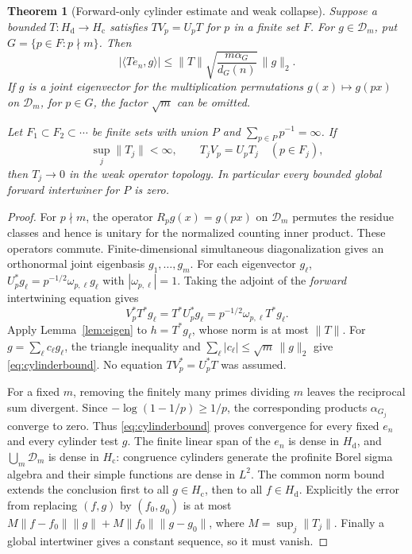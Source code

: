 \documentclass[11pt]{article}
\newtheorem{theorem}{Theorem}
\theoremstyle{remark}
\newcommand{\Hd}{H_{\mathrm d}}
\newcommand{\Hc}{H_{\mathrm c}}
\newcommand{\D}{\mathcal D}
\begin{document}
\begin{theorem}[Forward-only cylinder estimate and weak collapse]\label{thm:forward}
Suppose a bounded $T:\Hd\to\Hc$ satisfies $TV_p=U_pT$ for $p$ in a finite
set $F$.  For $g\in\D_m$, put $G=\{p\in F:p\nmid m\}$.  Then
\begin{equation}\label{eq:cylinderbound}
 |\langle Te_n,g\rangle|
 \leq \|T\|\sqrt{\frac{m\alpha_G}{d_G(n)}}\,\|g\|_2.
\end{equation}
If $g$ is a joint eigenvector for the multiplication permutations
$g(x)\mapsto g(px)$ on $\D_m$, for $p\in G$, the factor $\sqrt m$
can be omitted.

Let $F_1\subset F_2\subset\cdots$ be finite sets with union $P$ and
$\sum_{p\in P}p^{-1}=\infty$.  If
\[
 \sup_j\|T_j\|<\infty,\qquad T_jV_p=U_pT_j\quad(p\in F_j),
\]
then $T_j\longrightarrow0$ in the weak operator topology.
In particular every bounded global forward intertwiner for $P$ is zero.
\end{theorem}
\begin{proof}
For $p\nmid m$, the operator $R_pg(x)=g(px)$ on $\D_m$ permutes the
residue classes and hence is unitary for the normalized counting inner
product.  These operators commute.  Finite-dimensional simultaneous
diagonalization gives an orthonormal joint eigenbasis $g_1,\ldots,g_m$.
For each eigenvector $g_\ell$,
$U_p^*g_\ell=p^{-1/2}\omega_{p,\ell}g_\ell$ with
$|\omega_{p,\ell}|=1$.  Taking the adjoint of the \emph{forward}
intertwining equation gives
\[
 V_p^*T^*g_\ell=T^*U_p^*g_\ell
   =p^{-1/2}\omega_{p,\ell}T^*g_\ell.
\]
Apply Lemma~\ref{lem:eigen} to $h=T^*g_\ell$, whose norm is at most $\|T\|$.
For $g=\sum_\ell c_\ell g_\ell$, the triangle inequality and
$\sum_\ell|c_\ell|\leq\sqrt m\,\|g\|_2$ give
\eqref{eq:cylinderbound}.  No equation $TV_p^*=U_p^*T$ was assumed.

For a fixed $m$, removing the finitely many primes dividing $m$ leaves
the reciprocal sum divergent.  Since
$-\log(1-1/p)\geq1/p$, the corresponding products $\alpha_{G_j}$
converge to zero.  Thus \eqref{eq:cylinderbound} proves convergence for
every fixed $e_n$ and every cylinder test $g$.
The finite linear span of the $e_n$ is dense in $\Hd$, and
$\bigcup_m\D_m$ is dense in $\Hc$: congruence cylinders generate the
profinite Borel sigma algebra and their simple functions are dense in
$L^2$.  The common norm bound extends the conclusion first to all
$g\in\Hc$, then to all $f\in\Hd$.  Explicitly the error from replacing
$(f,g)$ by $(f_0,g_0)$ is at most
$M\|f-f_0\|\|g\|+M\|f_0\|\|g-g_0\|$, where $M=\sup_j\|T_j\|$.
Finally a global intertwiner gives a constant sequence, so it must vanish.
\end{proof}
\end{document}
